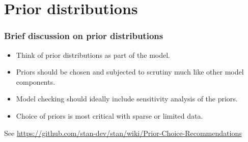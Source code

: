\documentclass[handout]{beamer}
\begin{document}


\section{Prior distributions}

\begin{frame}
  \frametitle{Brief discussion on prior distributions}

  \begin{itemize}
  \item Think of prior distributions as part of the model.
\item Priors should be chosen and 
subjected to scrutiny much like other model components.
\item Model checking should ideally include sensitivity analysis of
  the priors.
\item Choice of priors is most critical with sparse or limited data.
  \end{itemize}

See \url{https://github.com/stan-dev/stan/wiki/Prior-Choice-Recommendations}

\end{frame}
\end{document}
